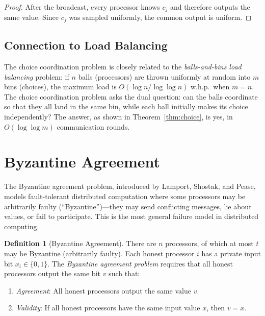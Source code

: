 \documentclass[twoside,12pt]{book}
\theoremstyle{plain}
\theoremstyle{definition}
\newtheorem{definition}[theorem]{Definition}
\theoremstyle{remark}
\begin{document}
\begin{proof}
After the broadcast, every processor knows $c_j$ and therefore outputs the
same value. Since $c_j$ was sampled uniformly, the common output is uniform.

\end{proof}

\subsection{Connection to Load Balancing}
\label{subsec:choice-load-balancing}

The choice coordination problem is closely related to the \emph{balls-and-bins load balancing} problem: if $n$ balls (processors) are thrown uniformly at random into $m$ bins (choices), the maximum load is $O(\log n / \log \log n)$ w.h.p.\ when $m = n$. The choice coordination problem asks the dual question: can the balls coordinate so that they all land in the same bin, while each ball initially makes its choice independently? The answer, as shown in Theorem~\ref{thm:choice}, is yes, in $O(\log \log m)$ communication rounds.

\section{Byzantine Agreement}
\label{sec:byzantine}

The Byzantine agreement problem, introduced by Lamport, Shostak, and Pease, models fault-tolerant distributed computation where some processors may be arbitrarily faulty (``Byzantine'')---they may send conflicting messages, lie about values, or fail to participate. This is the most general failure model in distributed computing.

\begin{definition}[Byzantine Agreement]
\label{def:byzantine}
There are $n$ processors, of which at most $t$ may be Byzantine (arbitrarily faulty). Each honest processor $i$ has a private input bit $x_i \in \{0, 1\}$. The \emph{Byzantine agreement problem} requires that all honest processors output the same bit $v$ such that:
\begin{enumerate}[label=(\roman*)]
\item \emph{Agreement}: All honest processors output the same value $v$.
\item \emph{Validity}: If all honest processors have the same input value $x$, then $v = x$.
\end{enumerate}
\end{definition}
\end{document}
